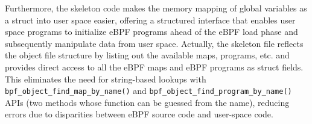 Furthermore, the skeleton code makes the memory mapping of global variables as a struct into user space easier, offering a structured interface that enables user space programs to initialize eBPF programs ahead of the eBPF load phase and subsequently manipulate data from user space.
Actually, the skeleton file reflects the object file structure by listing out the available maps, programs, etc. and provides direct access to all the eBPF maps and eBPF programs as struct fields. 
This eliminates the need for string-based lookups with \texttt{bpf\_object\_find\_map\_by\_name()} and \texttt{bpf\_object\_find\_program\_by\_name()} APIs (two methods whose function can be guessed from the name), reducing errors due to disparities between eBPF source code and user-space code.